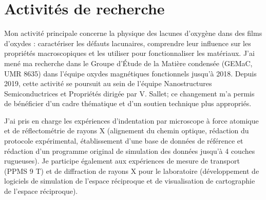 \section{Activités de recherche}

Mon activité principale concerne la physique des lacunes d'oxygène dans des films d'oxydes :
caractériser les défauts lacunaires, comprendre leur influence sur les propriétés macroscopiques et les utiliser pour fonctionnaliser les matériaux.
J'ai mené ma recherche dans le Groupe d'\'Etude de la Matière condensée (GEMaC, UMR 8635) dans l'équipe oxydes magnétiques fonctionnels jusqu'à 2018.
Depuis 2019, cette activité se poursuit au sein de l'équipe Nanostructures Semiconductrices et Propriétés dirigée par V. Sallet; ce changement m'a permis de bénéficier d'un cadre thématique et d'un soutien technique plus appropriés.

J'ai pris en charge les expériences d'indentation par microscope à force atomique et de réflectométrie de rayons X (alignement du chemin optique, rédaction du protocole expérimental, établissement d'une base de données de référence et rédaction d'un programme original de simulation des données jusqu'à 4 couches rugueuses).
Je participe également aux expériences de mesure de transport (PPMS 9 T) et de diffraction de rayons X pour le laboratoire (développement de logiciels de simulation de l'espace réciproque et de visualisation de cartographie de l'espace réciproque).



